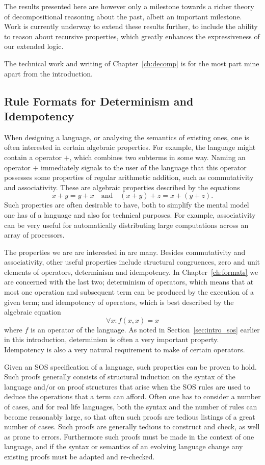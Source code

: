 The results presented here are however only a milestone towards a richer theory
of decompositional reasoning about the past, albeit an important milestone. Work
is currently underway to extend these results further, to include the ability to
reason about recursive properties, which greatly enhances the expressiveness of
our extended logic.

The technical work and writing of Chapter~\ref{ch:decomp} is for the most part
mine apart from the introduction.


\subsection{Rule Formats for Determinism and Idempotency} %

When designing a language, or analysing the semantics of existing ones,
one is often interested in certain algebraic properties. For example, the language
might contain a operator $+$, which combines two subterms in some way. Naming
an operator $+$ immediately signals to the user of the language that this operator
possesses some properties of regular arithmetic addition, such as commutativity
and associativity. These are algebraic properties described by the equations
\[
    x + y = y + x  \quad\textrm{and}\quad (x + y) + z = x + (y + z).
\]
Such properties are often desirable to have, both to simplify the mental model
one has of a language and also for technical purposes. For example, associativity
can be very useful for automatically distributing large computations across an
array of processors.

The properties we are are interested in are many. Besides commutativity and
associativity, other useful properties include structural congruences, zero and
unit elements of operators, determinism and idempotency. In Chapter~\ref{ch:formats}
we are concerned with the last two; determinism of operators, which means that
at most one operation and subsequent term can be produced by the execution of
a given term; and idempotency of operators, which is best described by the algebraic
equation
\[
    \forall x : f(x,x) = x
\]
where $f$ is an operator of the language. As noted in Section~\ref{sec:intro_sos}
earlier in this introduction, determinism is often a very important property.
Idempotency is also a very natural requirement to make of certain operators.

Given an SOS specification of a language, such properties can be proven to hold.
Such proofs generally consists of structural induction on the syntax of the language
and/or on proof structures that arise when the SOS rules are used to deduce the
operations that a term can afford. Often one has to consider a number of cases,
and for real life languages, both the syntax and the number of rules can become
reasonably large, so that often such proofs are tedious listings of a great
number of cases. Such proofs are generally tedious to construct and check, as well
as prone to errors. Furthermore such proofs must be made in the context of one
language, and if the syntax or semantics of an evolving language change any existing
proofs must be adapted and re-checked.

